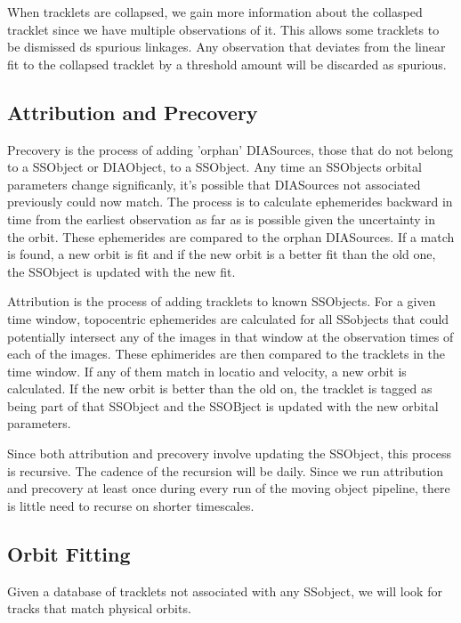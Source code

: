 When tracklets are collapsed, we gain more information about the collasped tracklet since we have multiple observations of it.  This allows some tracklets to be dismissed ds spurious linkages.  Any observation that deviates from the linear fit to the collapsed tracklet by a threshold amount will be discarded as spurious.

\subsection{Attribution and Precovery}
\label{sec:acAttributionAndPrecovery}
Precovery is the process of adding 'orphan' DIASources, those that do not belong to a SSObject or DIAObject, to a SSObject.  Any time an SSObjects orbital parameters change significanly, it's possible that DIASources not associated previously could now match.  The process is to calculate ephemerides backward in time from the earliest observation as far as is possible given the uncertainty in the orbit.  These ephemerides are compared to the orphan DIASources.  If a match is found, a new orbit is fit and if the new orbit is a better fit than the old one, the SSObject is updated with the new fit.

Attribution is the process of adding tracklets to known SSObjects.  For a given time window, topocentric ephemerides are calculated for all SSobjects that could potentially intersect any of the images in that window at the observation times of each of the images.  These ephimerides are then compared to the tracklets in the time window.  If any of them match in locatio and velocity, a new orbit is calculated.  If the new orbit is better than the old on, the tracklet is tagged as being part of that SSObject and the SSOBject is updated with the new orbital parameters.

Since both attribution and precovery involve updating the SSObject, this process is recursive.  The cadence of the recursion will be daily.  Since we run attribution and precovery at least once during every run of the moving object pipeline, there is little need to recurse on shorter timescales.

\subsection{Orbit Fitting}
\label{sec:acOrbitFitting}
Given a database of tracklets not associated with any SSobject, we will look for tracks that match physical orbits.

